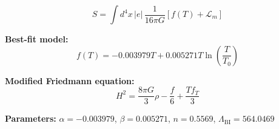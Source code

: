 
\begin{equation}
  S = \int d^4x \, |e| \, \frac{1}{16\pi G} \left[ f(T) + \mathcal{L}_m \right]
\end{equation}

\textbf{Best-fit model:}
\begin{equation}
  f(T) = -0.003979 T + 0.005271 T \ln\!\left(\frac{T}{T_0}\right)
\end{equation}

\textbf{Modified Friedmann equation:}
\begin{equation}
  H^2 = \frac{8\pi G}{3} \rho - \frac{f}{6} + \frac{T f_T}{3}
\end{equation}

\textbf{Parameters:}
$\alpha = -0.003979$, \quad
$\beta = 0.005271$, \quad
$n = 0.5569$, \quad
$\Lambda_{\text{BI}} = 564.0469$